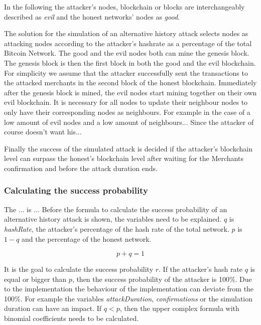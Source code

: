 In the following the attacker's nodes, blockchain or blocks are interchangeably described as \textit{evil} and the honest networks' nodes as \textit{good}.\linebreak

The solution for the simulation of an alternative history attack selects nodes as attacking nodes according to the attacker's hashrate as a percentage of the total Bitcoin Network.
The good and the evil nodes both can mine the genesis block. The genesis block is then the first block in both the good and the evil blockchain. For simplicity we assume that the attacker successfully sent the transactions to the attacked merchants in the second block of the honest blockchain. Immediately after the genesis block is mined, the evil nodes start mining together on their own evil blockchain. It is necessary for all nodes to update their neighbour nodes to only have their corresponding nodes as neighbours. For example in the case of a low amount of evil nodes and a low amount of neighbours... Since the attacker of course doesn't want his...\linebreak

Finally the success of the simulated attack is decided if the attacker's blockchain level can surpass the honest's blockchain level after waiting for the Merchants confirmation and before the attack duration ends.

\subsubsection{Calculating the success probability  \cite{doublespending}}

The ... is ...
Before the formula to calculate the success probability of an alternative history attack is shown, the variables need to be explained.\linebreak
$q$ is \textit{hashRate}, the attacker's percentage of the hash rate of the total network. $p$ is $1-q$ and the percentage of the honest network.

\begin{equation}
p + q = 1
\end{equation}

It is the goal to calculate the success probability $r$. If the attacker's hash rate $q$ is equal or bigger than $p$, then the success probability of the attacker is 100\%.\newline
Due to the implementation the behaviour of the implementation can deviate from the 100\%. For example the variables \textit{attackDuration}, \textit{confirmations} or the simulation duration can have an impact.\newline
If $q < p$, then the upper complex formula with binomial coefficients needs to be calculated.

